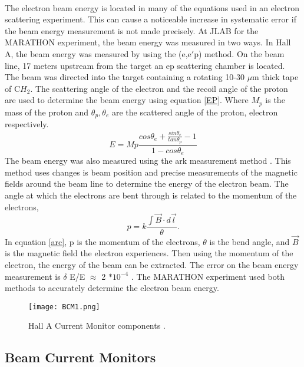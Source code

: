 	 \paragraph{}The electron beam energy is located in many of the equations used in an electron scattering experiment. This can cause a noticeable increase in systematic error if the beam energy measurement is not made precisely. At JLAB for the MARATHON experiment, the beam energy was measured in two ways. In Hall A, the beam energy was measured by using the (e,e$\prime$p) method. On the beam line, 17 meters upstream from the target an ep scattering chamber is located. The beam was directed into the target containing a rotating 10-30 $\mu$m thick tape of C$H_2$. The scattering angle of the electron and the recoil angle of the proton are used to determine the beam energy using equation \ref{EP}. Where $M_p$ is the mass of the proton and $\theta_p, \theta_e$ are the scattered angle of the proton, electron respectively. 
	\begin{equation}
	\label{EP}
	E = Mp \frac{cos\theta_e + \frac{sin\theta_e}{tan\theta_p}-1}{1 - cos\theta_e} 
	\end{equation}
	The beam energy was also measured using the ark measurement method \cite{Flay}. This method uses changes is beam position and precise measurements of the magnetic fields around the beam line to determine the energy of the electron beam. The angle at which the electrons are bent through is related to the momentum of the electrons,
	\begin{equation}
	\label{arc}
	p = k \frac{\int \vec{B} \cdot d\vec{l}}{\theta}.
	\end{equation}	
	In equation \ref{arc}, p is the momentum of the electrons, $\theta$ is the bend angle, and $\vec{B}$ is the magnetic field the electron experiences. Then using the momentum of the electron, the energy of the beam can be extracted. The error on the beam energy measurement is $\delta$ E/E $\approx$ 2 $* 10^{-4} $ \cite{EPMet, Flay}.  The MARATHON experiment used both methods to accurately determine the electron beam energy.
	
		  	\begin{figure}[H]
		  	 	 		\centering
		  	 	 		\caption{Hall A Current Monitor components \cite{BCM1}. 
		  	 	 		\label{BCMpng}}
		  	 	 		\texttt{[image: BCM1.png]} 
		  	\end{figure}
	\subsection{Beam Current Monitors}
